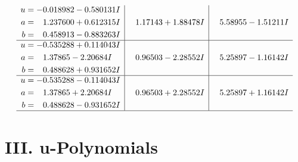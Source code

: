 \documentclass[1p]{elsarticle_modified}
\theoremstyle{definition}
\begin{document}
$$\begin{array}{c|c|c}
\begin{aligned}
u &= -0.018982 - 0.580131 I \\
a &= \phantom{-}1.237600 + 0.612315 I \\
b &= \phantom{-}0.458913 - 0.883263 I\end{aligned}
 & \phantom{-}1.17143 + 1.88478 I & \phantom{-}5.58955 - 1.51211 I \\ \hline\begin{aligned}
u &= -0.535288 + 0.114043 I \\
a &= \phantom{-}1.37865 - 2.20684 I \\
b &= \phantom{-}0.488628 + 0.931652 I\end{aligned}
 & \phantom{-}0.96503 - 2.28552 I & \phantom{-}5.25897 - 1.16142 I \\ \hline\begin{aligned}
u &= -0.535288 - 0.114043 I \\
a &= \phantom{-}1.37865 + 2.20684 I \\
b &= \phantom{-}0.488628 - 0.931652 I\end{aligned}
 & \phantom{-}0.96503 + 2.28552 I & \phantom{-}5.25897 + 1.16142 I\\
 \hline 
 \end{array}$$\newpage
\newpage\renewcommand{\arraystretch}{1}
\centering \section*{ III. u-Polynomials}
\end{document}
